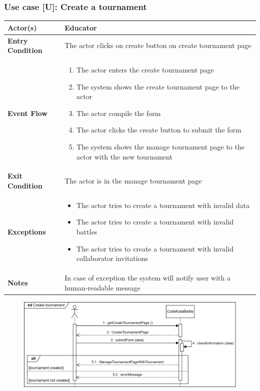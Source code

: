 \documentclass[12pt, a4paper]{report}
\newcounter{useCase}
\newcommand{\usecase}[9]{
    \def\arraystretch{1.5} 
    \subsubsection*{Use case [U#2]: #3}
    \vspace*{0.2cm}
    \begin{center}
        \begin{tabular}{|l|p{12cm}|}
            \hline
            \textbf{Actor(s)} & #4 \\
            \hline
            \textbf{Entry Condition} & #5 \\
            \hline
            \textbf{Event Flow} & #6 \\
            \hline
            \textbf{Exit Condition} & #7 \\
            \hline
            \textbf{Exceptions} & #8 \\
            \hline
            \textbf{Notes} & #9 \\
            \hline
        \end{tabular}
    \end{center}
    #1
}
\begin{document}
    \usecase{\begin{figure}[H]\centering\includegraphics[width=0.9\linewidth]{images/createtournament.png}\end{figure}}        
    {\arabic{useCase}\stepcounter{useCase}}
    {Create a tournament}
    {Educator}
    {The actor clicks on create button on create tournament page}
    {
    \begin{enumerate}
        \item The actor enters the create tournament page
        \item The system shows the create tournament page to the actor
        \item The actor compile the form
        \item The actor clicks the create button to submit the form
        \item The system shows the manage tournament page to the actor with the new tournament
    \end{enumerate}
    }
    {The actor is in the manage tournament page}
    {
    \begin{itemize}
        \item The actor tries to create a tournament with invalid data
        \item The actor tries to create a tournament with invalid battles
        \item The actor tries to create a tournament with invalid collaborator invitations
    \end{itemize}
    }
    {In case of exception the system will notify user with a human-readable message}
    
\end{document}
